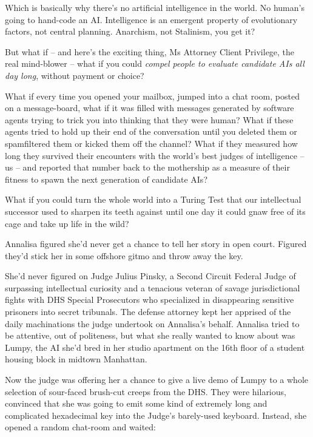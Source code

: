 Which is basically why there's no artificial intelligence in the world. 
No human's going to hand-code an AI. Intelligence is an emergent 
property of evolutionary factors, not central planning. Anarchism, not 
Stalinism, you get it?

But what if -- and here's the exciting thing, Ms Attorney Client 
Privilege, the real mind-blower -- what if you could \emph{compel 
people to evaluate candidate AIs all day long}, without payment or 
choice?

What if every time you opened your mailbox, jumped into a chat room, 
posted on a message-board, what if it was filled with messages 
generated by software agents trying to trick you into thinking that 
they were human? What if these agents tried to hold up their end of the 
conversation until you deleted them or spamfiltered them or kicked them 
off the channel? What if they measured how long they survived their 
encounters with the world's best judges of intelligence -- us -- and 
reported that number back to the mothership as a measure of their 
fitness to spawn the next generation of candidate AIs?

What if you could turn the whole world into a Turing Test that our 
intellectual successor used to sharpen its teeth against until one day 
it could gnaw free of its cage and take up life in the wild?

\tb

Annalisa figured she'd never get a chance to tell her story in open 
court. Figured they'd stick her in some offshore gitmo and throw away 
the key.

She'd never figured on Judge Julius Pinsky, a Second Circuit Federal 
Judge of surpassing intellectual curiosity and a tenacious veteran of 
savage jurisdictional fights with DHS Special Prosecutors who 
specialized in disappearing sensitive prisoners into secret tribunals. 
The defense attorney kept her apprised of the daily machinations the 
judge undertook on Annalisa's behalf. Annalisa tried to be attentive, 
out of politeness, but what she really wanted to know about was Lumpy, 
the AI she'd bred in her studio apartment on the 16th floor of a 
student housing block in midtown Manhattan.

Now the judge was offering her a chance to give a live demo of Lumpy to 
a whole selection of sour-faced brush-cut creeps from the DHS. They 
were hilarious, convinced that she was going to emit some kind of 
extremely long and complicated hexadecimal key into the Judge's 
barely-used keyboard. Instead, she opened a random chat-room and waited:

